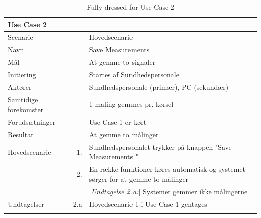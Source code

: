 \begin{longtabu} to  %
	{\large \textbf{Use Case 2 }} && \\
	\toprule
	Scenarie 				&&	Hovedscenarie\\
	Navn 					&& 	Save Measurements\\
	Mål 					&& 	At gemme to signaler  \\
	Initiering 				&& 	Startes af Sundhedspersonale\\
	Aktører 				&& 	Sundhedspersonale (primær), PC (sekundær)\\

	Samtidige forekomster  	&& 	1 måling gemmes pr. kørsel  \\
	Forudsætninger 			&&	Use Case 1 er kørt \\ 
	Resultat 				&& At gemme to målinger \\ \midrule
	Hovedscenarie 			&    1. 	&	Sundhedspersonalet trykker på knappen "Save Measurements "\\				 	
							&    2. 	& 	En række funktioner køres automatisk og systemet sørger for at gemme to målinger\\
							
	&&[\textit{Undtagelse 2.a:}] Systemet gemmer  ikke målingerne\\ \midrule							
							
	Undtagelser 			&		2.a	& 	Hovedscenarie 1 i Use Case 1 gentages  \\ \bottomrule
	
	\caption{Fully dressed for Use Case 2}
	\label{UC2}
\end{longtabu}



